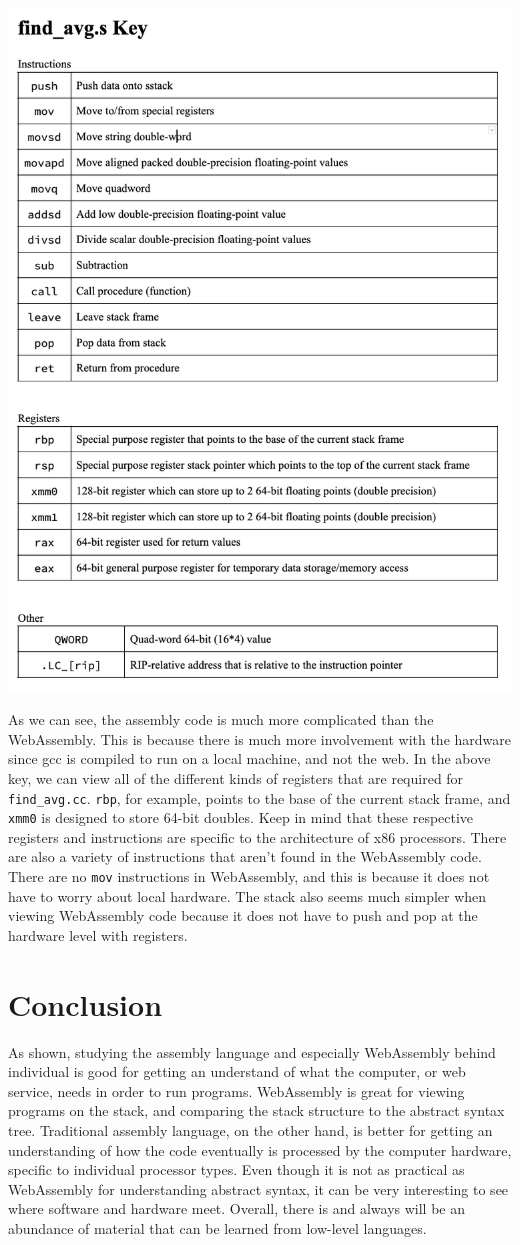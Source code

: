 \documentclass{article}
\theoremstyle{theorem}
\theoremstyle{definition}
\theoremstyle{remark}
\begin{document}
\includegraphics[width=.75\textwidth]{Images/find_avg.s_key.png}
\cite{AG}

\bigskip\noindent
As we can see, the assembly code is much more complicated than the WebAssembly. This is because there is much more involvement with the hardware since gcc is compiled to run on a local machine, and not the web. In the above key, we can view all of the different kinds of registers that are required for \verb|find_avg.cc|. \verb|rbp|, for example, points to the base of the current stack frame, and \verb|xmm0| is designed to store 64-bit doubles. Keep in mind that these respective registers and instructions are specific to the architecture of x86 processors. There are also a variety of instructions that aren't found in the WebAssembly code. There are no \verb|mov| instructions in WebAssembly, and this is because it does not have to worry about local hardware. The stack also seems much simpler when viewing WebAssembly code because it does not have to push and pop at the hardware level with registers.


\section{Conclusion}\label{conclusions}

\medskip\noindent
As shown, studying the assembly language and especially WebAssembly behind individual is good for getting an understand of what the computer, or web service, needs in order to run programs. WebAssembly is great for viewing programs on the stack, and comparing the stack structure to the abstract syntax tree. Traditional assembly language, on the other hand, is better for getting an understanding of how the code eventually is processed by the computer hardware, specific to individual processor types. Even though it is not as practical as WebAssembly for understanding abstract syntax, it can be very interesting to see where software and hardware meet. Overall, there is and always will be an abundance of material that can be learned from low-level languages.
\end{document}
